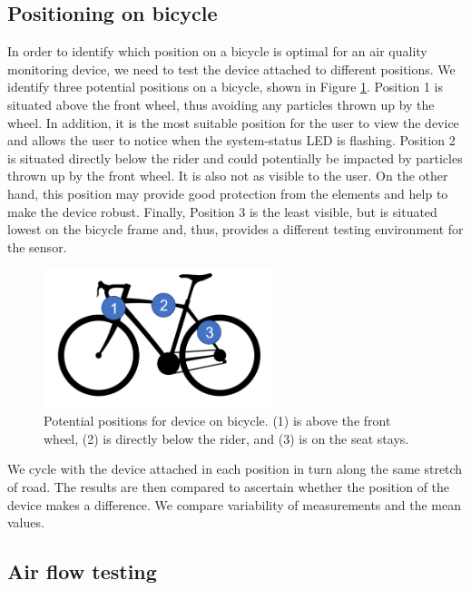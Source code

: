 \documentclass[11pt]{report}
\begin{document}
\subsection{Positioning on bicycle} \label{position_testing}

In order to identify which position on a bicycle is optimal for an air quality monitoring device, we need to test the device attached to different positions. We identify three potential positions on a bicycle, shown in Figure \ref{bicycle_positions}. Position 1 is situated above the front wheel, thus avoiding any particles thrown up by the wheel. In addition, it is the most suitable position for the user to view the device and allows the user to notice when the system-status LED is flashing. Position 2 is situated directly below the rider and could potentially be impacted by particles thrown up by the front wheel. It is also not as visible to the user. On the other hand, this position may provide good protection from the elements and help to make the device robust. Finally, Position 3 is the least visible, but is situated lowest on the bicycle frame and, thus, provides a different testing environment for the sensor.

\begin{figure}[!tb]
\centering
\includegraphics[width=0.6\textwidth]{images/bicycle_positions}
\caption[Device positions on bicycle.]{Potential positions for device on bicycle. (1) is above the front wheel, (2) is directly below the rider, and (3) is on the seat stays.}
\label{bicycle_positions}
\end{figure}

We cycle with the device attached in each position in turn along the same stretch of road. The results are then compared to ascertain whether the position of the device makes a difference. We compare variability of measurements and the mean values.


\subsection{Air flow testing}
\end{document}
